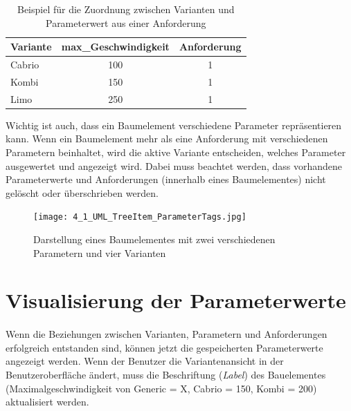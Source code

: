\begin{table}[h]
\begin{center}
	\begin{tabular}{|l||c|c|}
	 \hline
	 Variante &max\_Geschwindigkeit &Anforderung\\
	 \hline\hline
	 Cabrio   &100                      & 1\\
	 \hline
	 Kombi    &150                      & 1\\
	 \hline
	 Limo     &250                      & 1\\
	 \hline
	\end{tabular}
	
	\caption{Beispiel für die Zuordnung zwischen Varianten und Parameterwert aus einer Anforderung}
	\label{table:Zuordnung}
\end{center}
\end{table}

Wichtig ist auch, dass ein Baumelement verschiedene Parameter repräsentieren kann. Wenn ein Baumelement mehr als eine Anforderung mit verschiedenen Parametern beinhaltet, wird die aktive Variante entscheiden, welches Parameter ausgewertet  und angezeigt wird. Dabei muss beachtet werden, dass vorhandene Parameterwerte und Anforderungen (innerhalb eines Baumelementes) nicht gelöscht oder überschrieben werden.\\

\begin{figure}[h!]
  \begin{center}
    \texttt{[image: 4\_1\_UML\_TreeItem\_ParameterTags.jpg]}
  		  \caption{Darstellung eines Baumelementes mit zwei verschiedenen Parametern und vier Varianten}
     \label{ttn.treeitem_vars}
  \end{center}
\end{figure}

\newpage
\section{Visualisierung der Parameterwerte}\label{sec.visualisierung}
\paragraph{}

Wenn die Beziehungen zwischen Varianten, Parametern und Anforderungen erfolgreich entstanden sind, können jetzt die gespeicherten Parameterwerte angezeigt werden. Wenn der Benutzer die Variantenansicht in der Benutzeroberfläche ändert, muss die Beschriftung (\textit{Label}) des Bauelementes (Maximalgeschwindigkeit von Generic = X, Cabrio = 150, Kombi = 200) aktualisiert werden.


